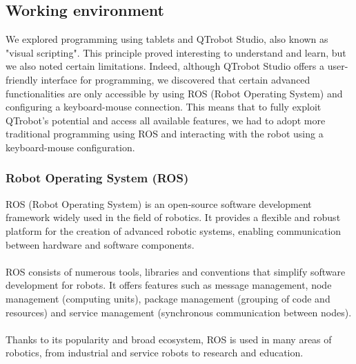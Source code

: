 \subsection{Working environment}
We explored programming using tablets and QTrobot Studio, also known as "visual scripting". This principle proved interesting to understand and learn, but we also noted certain limitations. Indeed, although QTrobot Studio offers a user-friendly interface for programming, we discovered that certain advanced functionalities are only accessible by using ROS (Robot Operating System) and configuring a keyboard-mouse connection. This means that to fully exploit QTrobot's potential and access all available features, we had to adopt more traditional programming using ROS and interacting with the robot using a keyboard-mouse configuration.
\vspace*{0.5cm}
\subsubsection{Robot Operating System (ROS)}
ROS (Robot Operating System) is an open-source software development framework widely used in the field of robotics. It provides a flexible and robust platform for the creation of advanced robotic systems, enabling communication between hardware and software components.\\
\\
ROS consists of numerous tools, libraries and conventions that simplify software development for robots. It offers features such as message management, node management (computing units), package management (grouping of code and resources) and service management (synchronous communication between nodes).\\
\\
Thanks to its popularity and broad ecosystem, ROS is used in many areas of robotics, from industrial and service robots to research and education. \\

